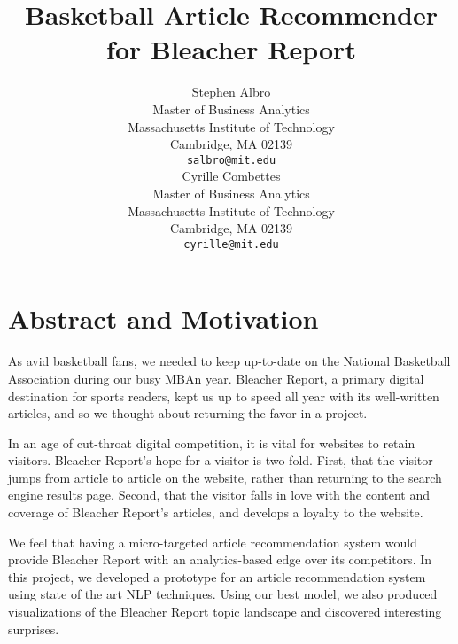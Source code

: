 \documentclass{article}
\title{Basketball Article Recommender\\
for Bleacher Report}
\author{
  Stephen Albro\\
  Master of Business Analytics\\
  Massachusetts Institute of Technology\\
  Cambridge, MA 02139\\
  \texttt{salbro@mit.edu}\\
   \And
   Cyrille Combettes \\
   Master of Business Analytics\\
  Massachusetts Institute of Technology\\
  Cambridge, MA 02139\\
   \texttt{cyrille@mit.edu} \\
}
\begin{document}

\maketitle


\section{Abstract and Motivation}
As avid basketball fans, we needed to keep up-to-date on the National Basketball Association during our busy MBAn year. Bleacher Report, a primary digital destination for sports readers, kept us up to speed all year with its well-written articles, and so we thought about returning the favor in a project.

In an age of cut-throat digital competition, it is vital for websites to retain visitors. Bleacher Report's hope for a visitor is two-fold. First, that the visitor jumps from article to article on the website, rather than returning to the search engine results page. Second, that the visitor falls in love with the content and coverage of Bleacher Report's articles, and develops a
loyalty to the website.

We feel that having a micro-targeted article recommendation system would provide Bleacher 
Report with an analytics-based edge over its competitors. In this project,
we developed a prototype for an article recommendation system using state of the art NLP techniques.  Using our best model, we also produced visualizations of the Bleacher Report topic landscape and discovered interesting surprises.


\end{document}
